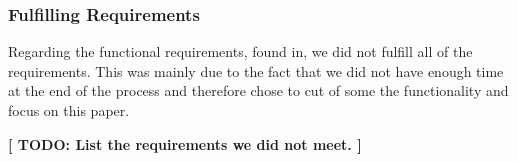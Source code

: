 \subsubsection{Fulfilling Requirements}
Regarding the functional requirements, found in, we did not fulfill all of the requirements. This was mainly due to the fact that we did not have enough time at the end of the process and therefore chose to cut of some the functionality and focus on this paper.

\textbf{[ TODO: List the requirements we did not meet. ]}